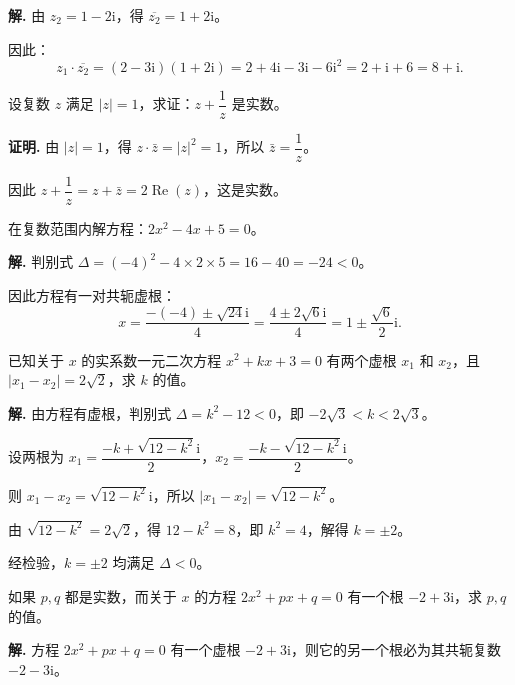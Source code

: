 \documentclass[11pt]{ctexrep}
\begin{document}
\textbf{解.} 由 $z_2 = 1 - 2\mathrm{i}$，得 $\overline{z_2} = 1 + 2\mathrm{i}$。

因此：
\[
    z_1 \cdot \overline{z_2} = (2 - 3\mathrm{i})(1 + 2\mathrm{i}) = 2 + 4\mathrm{i} - 3\mathrm{i} - 6\mathrm{i}^2 = 2 + \mathrm{i} + 6 = 8 + \mathrm{i}.
\]

\begin{example}[复数几何意义的应用]
    设复数 $z$ 满足 $|z| = 1$，求证：$z + \dfrac{1}{z}$ 是实数。
\end{example}

\textbf{证明.} 由 $|z| = 1$，得 $z \cdot \bar{z} = |z|^2 = 1$，所以 $\bar{z} = \dfrac{1}{z}$。

因此 $z + \dfrac{1}{z} = z + \bar{z} = 2\operatorname{Re}(z)$，这是实数。

\begin{example}[实系数一元二次方程求解]
    在复数范围内解方程：$2x^2 - 4x + 5 = 0$。
\end{example}

\textbf{解.} 判别式 $\Delta = (-4)^2 - 4 \times 2 \times 5 = 16 - 40 = -24 < 0$。

因此方程有一对共轭虚根：
\[
    x = \frac{-(-4) \pm \sqrt{24}\mathrm{i}}{4} = \frac{4 \pm 2\sqrt{6}\mathrm{i}}{4} = 1 \pm \frac{\sqrt{6}}{2}\mathrm{i}.
\]

\begin{realexam}[练习]
    已知关于 $x$ 的实系数一元二次方程 $x^2 + kx + 3 = 0$ 有两个虚根 $x_1$ 和 $x_2$，且 $|x_1 - x_2| = 2\sqrt{2}$，求 $k$ 的值。
\end{realexam}

\textbf{解.} 由方程有虚根，判别式 $\Delta = k^2 - 12 < 0$，即 $-2\sqrt{3} < k < 2\sqrt{3}$。

设两根为 $x_1 = \dfrac{-k + \sqrt{12 - k^2}\mathrm{i}}{2}$，$x_2 = \dfrac{-k - \sqrt{12 - k^2}\mathrm{i}}{2}$。

则 $x_1 - x_2 = \sqrt{12 - k^2}\mathrm{i}$，所以 $|x_1 - x_2| = \sqrt{12 - k^2}$。

由 $\sqrt{12 - k^2} = 2\sqrt{2}$，得 $12 - k^2 = 8$，即 $k^2 = 4$，解得 $k = \pm 2$。

经检验，$k = \pm 2$ 均满足 $\Delta < 0$。

\begin{example}[实系数方程与根的关系]
    如果 $p, q$ 都是实数，而关于 $x$ 的方程 $2x^2 + px + q = 0$ 有一个根 $-2 + 3\mathrm{i}$，求 $p, q$ 的值。
\end{example}

\textbf{解.} 方程 $2x^2 + px + q = 0$ 有一个虚根 $-2 + 3\mathrm{i}$，则它的另一个根必为其共轭复数 $-2 - 3\mathrm{i}$。
\end{document}
